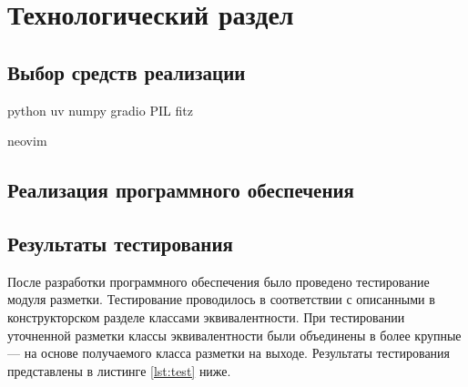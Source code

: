 \section{Технологический раздел}



\subsection{Выбор средств реализации}

python
uv
numpy
gradio
PIL
fitz

neovim


\subsection{Реализация программного обеспечения}


\subsection{Результаты тестирования}

После разработки программного обеспечения было проведено тестирование модуля разметки.
Тестирование проводилось в соответствии с описанными в конструкторском разделе классами эквивалентности.
При тестировании уточненной разметки классы эквивалентности были объединены в более крупные --- на основе получаемого класса разметки на выходе.
Результаты тестирования представлены в листинге \ref{lst:test} ниже.

